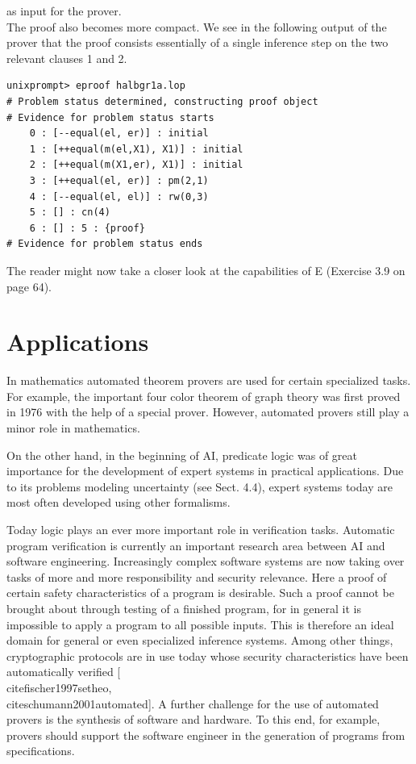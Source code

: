 \documentclass[10pt]{book}
\begin{document}
as input for the prover.\\
The proof also becomes more compact. We see in the following output of the prover that the proof consists essentially of a single inference step on the two relevant clauses 1 and 2.

\begin{verbatim}
unixprompt> eproof halbgr1a.lop
# Problem status determined, constructing proof object
# Evidence for problem status starts
    0 : [--equal(el, er)] : initial
    1 : [++equal(m(el,X1), X1)] : initial
    2 : [++equal(m(X1,er), X1)] : initial
    3 : [++equal(el, er)] : pm(2,1)
    4 : [--equal(el, el)] : rw(0,3)
    5 : [] : cn(4)
    6 : [] : 5 : {proof}
# Evidence for problem status ends
\end{verbatim}

The reader might now take a closer look at the capabilities of E (Exercise 3.9 on page 64).

\section{Applications}
In mathematics automated theorem provers are used for certain specialized tasks. For example, the important four color theorem of graph theory was first proved in 1976 with the help of a special prover. However, automated provers still play a minor role in mathematics.

On the other hand, in the beginning of AI, predicate logic was of great importance for the development of expert systems in practical applications. Due to its problems modeling uncertainty (see Sect. 4.4), expert systems today are most often developed using other formalisms.


Today logic plays an ever more important role in verification tasks. Automatic program verification is currently an important research area between AI and software engineering. Increasingly complex software systems are now taking over tasks of more and more responsibility and security relevance. Here a proof of certain safety characteristics of a program is desirable. Such a proof cannot be brought about through testing of a finished program, for in general it is impossible to apply a program to all possible inputs. This is therefore an ideal domain for general or even specialized inference systems. Among other things, cryptographic protocols are in use today whose security characteristics have been automatically verified [\\cite{fischer1997setheo}, \\cite{schumann2001automated}]. A further challenge for the use of automated provers is the synthesis of software and hardware. To this end, for example, provers should support the software engineer in the generation of programs from specifications.
\end{document}
